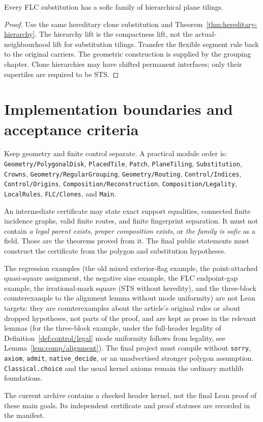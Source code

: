 \begin{theorem}\label{thm:flc-hierarchy}
Every FLC substitution has a sofic family of hierarchical plane tilings.
\end{theorem}
\begin{proof}
Use the same hereditary clone substitution and Theorem~\ref{thm:hereditary-hierarchy}.
The hierarchy lift is the compactness lift, not the actual-neighbourhood
lift for substitution tilings. Transfer the flexible segment rule back to
the original carriers. The geometric construction is supplied by the grouping chapter.
Clone hierarchies may have shifted permanent interfaces; only their
supertiles are required to be STS.
\end{proof}

\section{Implementation boundaries and acceptance criteria}

Keep geometry and finite control separate. A practical module order is:
\texttt{Geometry/PolygonalDisk}, \texttt{PlacedTile}, \texttt{Patch},
\texttt{PlaneTiling}, \texttt{Substitution}, \texttt{Crowns},
\texttt{Geometry/RegularGrouping}, \texttt{Geometry/Routing},
\texttt{Control/Indices}, \texttt{Control/Origins},
\texttt{Composition/Reconstruction}, \texttt{Composition/Legality},
\texttt{LocalRules}, \texttt{FLC/Clones}, and \texttt{Main}.

An intermediate certificate may state exact support equalities, connected
finite incidence graphs, valid finite routes, and finite fingerprint
separation. It must not contain \emph{a legal parent exists},
\emph{proper composition exists}, or \emph{the family is sofic} as a field.
Those are the theorems proved from it. The final public statements must
construct the certificate from the polygon and substitution hypotheses.

The regression examples (the old mixed exterior-flag example, the
point-attached quasi-square assignment, the negative sine example, the FLC
endpoint-gap example, the irrational-mark square (STS without heredity), and
the three-block counterexample to the alignment lemma without mode
uniformity) are not Lean targets: they are counterexamples about the
article's original rules or about dropped hypotheses, not parts of the proof,
and are kept as prose in the relevant lemmas (for the three-block example,
under the full-header legality of Definition~\ref{def:control/legal} mode
uniformity follows from legality, see Lemma~\ref{lem:comp/alignment}).
The final project must compile without
\texttt{sorry}, \texttt{axiom}, \texttt{admit}, \texttt{native\_decide}, or
an unadvertised stronger polygon assumption. \texttt{Classical.choice}
and the usual kernel axioms remain the ordinary mathlib foundations.

The current archive contains a checked header kernel, not the final Lean
proof of these main goals. Its independent certificate and proof statuses
are recorded in the manifest.
